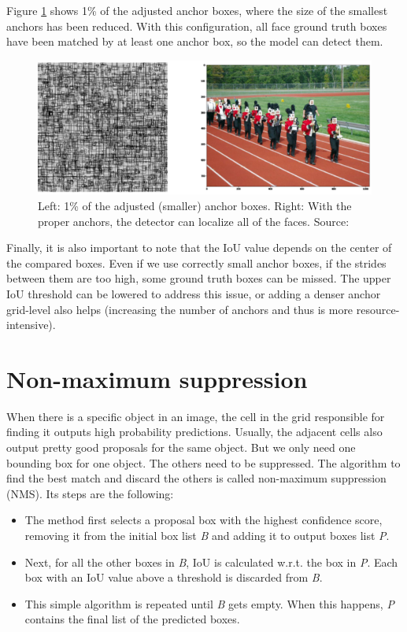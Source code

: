 Figure \ref{fig:anchor_good_match} shows 1\% of the adjusted anchor boxes, where the size of the smallest anchors has been reduced. With this configuration, all face ground truth boxes have been matched by at least one anchor box, so the model can detect them.

\begin{figure}[htb]
 \centerline{\includegraphics[width=1.0\columnwidth]{.//Figure/Detector/anchor_good_match.png}}
 \caption{Left: 1\% of the adjusted (smaller) anchor boxes. Right: With the proper anchors, the detector can localize all of the faces. Source: \cite{AnchorBoxes}}
 \label{fig:anchor_good_match}
\end{figure}

Finally, it is also important to note that the IoU value depends on the center of the compared boxes. Even if we use correctly small anchor boxes, if the strides between them are too high, some ground truth boxes can be missed. The upper IoU threshold can be lowered to address this issue, or adding a denser anchor grid-level also helps (increasing the number of anchors and thus is more resource-intensive).

\section{Non-maximum suppression}

When there is a specific object in an image, the cell in the grid responsible for finding it outputs high probability predictions. Usually, the adjacent cells also output pretty good proposals for the same object. But we only need one bounding box for one object. The others need to be suppressed. The algorithm to find the best match and discard the others is called non-maximum suppression\cite{NMS} (NMS). Its steps are the following:

\begin{itemize}
  \item The method first selects a proposal box with the highest confidence score, removing it from the initial box list \textit{B} and adding it to output boxes list \textit{P}.
  \item Next, for all the other boxes in \textit{B}, IoU is calculated w.r.t. the box in \textit{P}. Each box with an IoU value above a threshold is discarded from \textit{B}.
  \item This simple algorithm is repeated until \textit{B} gets empty. When this happens, \textit{P} contains the final list of the predicted boxes.
\end{itemize}

